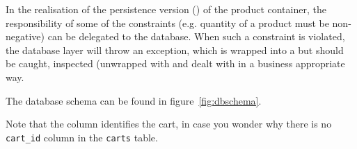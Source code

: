 In the realisation of the persistence version 
() of the product 
container, the responsibility of some of the constraints
(e.g. quantity of a product must be non-negative) can be delegated to
the database. When such a constraint is violated, the database layer
will throw an exception, which is wrapped into a  
but should be caught, inspected (unwrapped with  
and dealt with in a business appropriate way. 

The database schema can be found in figure~\ref{fig:dbschema}.

Note that the  column identifies the cart, in case you
wonder why there is no \texttt{cart\_id} column in the \texttt{carts} table.



